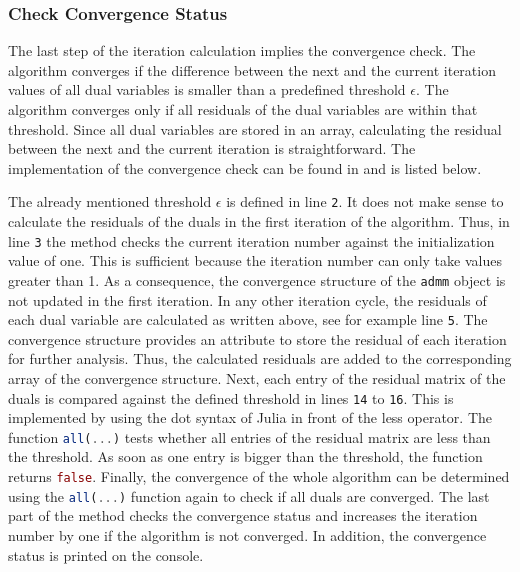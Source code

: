 \subsubsection*{Check Convergence Status}

The last step of the iteration calculation implies the convergence check. The algorithm converges if the difference between the next and the current iteration values of all dual variables is smaller than a predefined threshold $\epsilon$. The algorithm converges only if all residuals of the dual variables are within that threshold. Since all dual variables are stored in an array, calculating the residual between the next and the current iteration is straightforward. The implementation of the convergence check can be found in  and is listed below.



The already mentioned threshold $\epsilon$ is defined in line \texttt{2}. It does not make sense to calculate the residuals of the duals in the first iteration of the algorithm. Thus, in line \texttt{3} the method checks the current iteration number against the initialization value of one. This is sufficient because the iteration number can only take values greater than 1. As a consequence, the convergence structure of the \lstinline[language=julia]{admm} object is not updated in the first iteration. In any other iteration cycle, the residuals of each dual variable are calculated as written above, see for example line \texttt{5}. The convergence structure provides an attribute to store the residual of each iteration for further analysis. Thus, the calculated residuals are added to the corresponding array of the convergence structure. Next, each entry of the residual matrix of the duals is compared against the defined threshold in lines \texttt{14} to \texttt{16}. This is implemented by using the dot syntax of Julia in front of the less operator. The function \lstinline[language=julia]{all(...)} tests whether all entries of the residual matrix are less than the threshold. As soon as one entry is bigger than the threshold, the function returns \lstinline[language=julia]{false}. Finally, the convergence of the whole algorithm can be determined using the \lstinline[language=julia]{all(...)} function again to check if all duals are converged. The last part of the method checks the convergence status and increases the iteration number by one if the algorithm is not converged. In addition, the convergence status is printed on the console.
